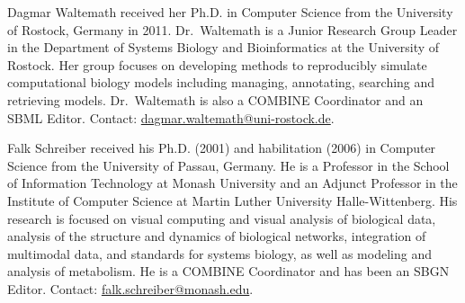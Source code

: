 \documentclass[journal,transmag]{IEEEtran}
\begin{document}
\begin{IEEEbiography}{Dagmar Waltemath}
received her Ph.D. in Computer Science from the University of Rostock, Germany in 2011. 
Dr.~Waltemath is a Junior Research Group Leader in the Department of Systems Biology and Bioinformatics at the University of Rostock. 
Her group focuses on developing methods to reproducibly simulate computational biology models including managing, annotating, searching and retrieving models.
Dr.~Waltemath is also a COMBINE Coordinator and an SBML Editor. 
Contact: \href{mailto:dagmar.waltemath@uni-rostock.de}{dagmar.waltemath@uni-rostock.de}.
\end{IEEEbiography}

\begin{IEEEbiography}{Falk Schreiber} 
received his Ph.D. (2001) and habilitation (2006) in Computer Science from the University of Passau, Germany. 
He is a Professor in the School of Information Technology at Monash University and an Adjunct Professor in the Institute of Computer Science at Martin Luther University Halle-Wittenberg. 
His research is focused on visual computing and visual analysis of biological data, analysis of the structure and dynamics of biological networks, integration of multimodal data, and standards for systems biology, as well as modeling and analysis of metabolism. 
He is a COMBINE Coordinator and has been an SBGN Editor.
Contact: \href{mailto:falk.schreiber@monash.edu}{falk.schreiber@monash.edu}.
\end{IEEEbiography}
\end{document}
